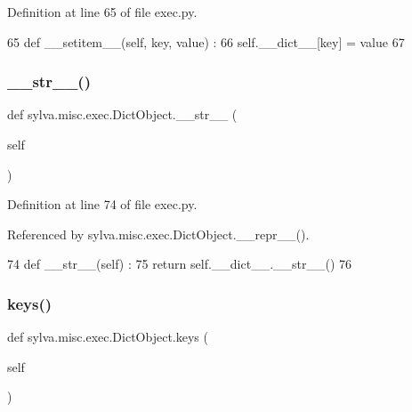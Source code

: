 Definition at line 65 of file exec.\+py.


\begin{DoxyCode}
65   \textcolor{keyword}{def }\_\_setitem\_\_(self, key, value) :
66     self.\_\_dict\_\_[key] = value
67 
\end{DoxyCode}
\mbox{\label{classsylva_1_1misc_1_1exec_1_1_dict_object_a7c974971714369cdba35b66479addd71}} 
\subsubsection{\texorpdfstring{\+\_\+\+\_\+str\+\_\+\+\_\+()}{\_\_str\_\_()}}
{\footnotesize\ttfamily def sylva.\+misc.\+exec.\+Dict\+Object.\+\_\+\+\_\+str\+\_\+\+\_\+ (\begin{DoxyParamCaption}\item[{}]{self }\end{DoxyParamCaption})}



Definition at line 74 of file exec.\+py.



Referenced by sylva.\+misc.\+exec.\+Dict\+Object.\+\_\+\+\_\+repr\+\_\+\+\_\+().


\begin{DoxyCode}
74   \textcolor{keyword}{def }\_\_str\_\_(self) :
75     \textcolor{keywordflow}{return} self.\_\_dict\_\_.\_\_str\_\_()
76 
\end{DoxyCode}
\mbox{\label{classsylva_1_1misc_1_1exec_1_1_dict_object_a8a81846b980700e7552d76f4fa1eff1e}} 
\subsubsection{\texorpdfstring{keys()}{keys()}}
{\footnotesize\ttfamily def sylva.\+misc.\+exec.\+Dict\+Object.\+keys (\begin{DoxyParamCaption}\item[{}]{self }\end{DoxyParamCaption})}



